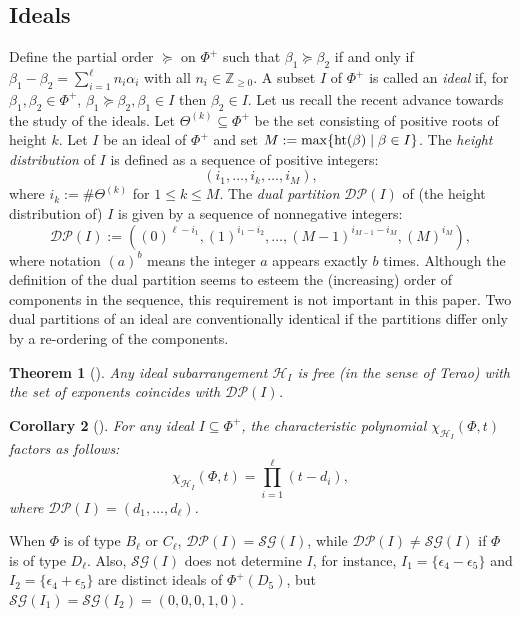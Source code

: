 \documentclass[12pt]{amsart}
\theoremstyle{plain}
\newtheorem{theorem}{Theorem}[section]
\newtheorem{corollary}[theorem]{Corollary}
\theoremstyle{definition}
\theoremstyle{remark}
\newcommand{\Z}{\mathbb{Z}}
\newcommand{\scH}{{\mathcal{H}}}
\newcommand{\DP}{{\mathcal{DP}}}
\newcommand{\SG}{{\mathcal{SG}}}
\begin{document}
 
\subsection{Ideals}
\label{subsec:ideals} 
Define the partial order $\succeq$ on $\Phi^+$ such that $\beta_1 \succeq \beta_2$ if and only if $\beta_1-\beta_2 = \sum_{i=1}^\ell n_i\alpha_i$ with all $n_i \in \Z_{\ge 0}$. 
A subset $I$ of  $ \Phi^+$ is called an \emph{ideal} if, for $\beta_1,\beta_2 \in \Phi^+$, $\beta_1 \succeq \beta_2, \beta_ 1 \in I$ then $\beta_2 \in I$. 
Let us recall the recent advance towards the study of the ideals. 
Let $\Theta^{(k)} \subseteq \Phi^+$ be the set consisting of positive roots of height $k$. 
Let $I$ be an ideal of  $ \Phi^+$ and set $M:=\max\{{\rm ht}(\beta)\mid \beta \in I\}$. 
The \textit{height distribution} of $I$ is defined as a sequence of positive integers:
$$(i_1, \ldots , i_k, \ldots , i_{M}),$$ where 
$i_k := \#\Theta^{(k)}$ for $1 \le k \le M$.
The  \textit{dual partition} $\DP(I)$ of (the height distribution of) $I$ is given by a sequence of nonnegative integers:
$$\DP(I) := \left( (0)^{\ell-i_1},(1)^{i_1-i_2},\ldots ,(M-1)^{i_{M-1}-i_{M}},(M)^{i_{M}}\right),$$ 
where notation $(a)^b$ means the integer $a$ appears exactly $b$ times.  
Although the definition of the dual partition seems to esteem the (increasing) order of components in the sequence, this requirement is not important in this paper. 
Two dual partitions of an ideal are conventionally identical if the partitions differ only by a re-ordering of the components.
\begin{theorem}[\cite{ABCHT16}]\label{thm:dual}
 Any ideal subarrangement $\scH_I$ is free (in the sense of Terao) with the set of exponents coincides with $\DP(I)$.
\end{theorem}

\begin{corollary}[\cite{ABCHT16}]\label{cor:ideal-factorization}   
 For any ideal $I\subseteq \Phi^+$, the characteristic polynomial $\chi_{\scH_I}(\Phi, t)$ factors as follows:
\begin{equation*}\label{eq:deal-factorization}
\chi_{\scH_I}(\Phi,t)= \prod_{i=1}^\ell (t-d_i),
\end{equation*}
where $\DP(I)=(d_1,\ldots,d_\ell)$.
\end{corollary}
 
When $\Phi$ is of type $B_\ell$ or $C_\ell$, $\DP(I)=\SG(I)$, while $\DP(I)\ne\SG(I)$ if $\Phi$ is of type $D_\ell$. 
Also, $\SG(I)$ does not determine $I$, for instance, $I_1=\{\epsilon_4 - \epsilon_5\}$ and $I_2=\{\epsilon_4 + \epsilon_5\}$ are distinct ideals of  $\Phi^+(D_5)$, but $\SG(I_1)=\SG(I_2)=(0,0,0,1,0)$. 
\end{document}
